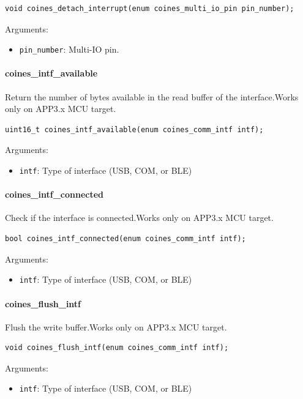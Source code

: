 \begin{lstlisting}
void coines_detach_interrupt(enum coines_multi_io_pin pin_number);
\end{lstlisting}

Arguments:
\begin{itemize}
	\item \texttt{pin\_number}: Multi-IO pin.
\end{itemize}

\paragraph{coines\_intf\_available}
Return the number of bytes available in the read buffer of the interface.Works only on APP3.x MCU target.

\begin{lstlisting}
uint16_t coines_intf_available(enum coines_comm_intf intf);
\end{lstlisting}

Arguments:
\begin{itemize}
	\item \texttt{intf}: Type of interface (USB, COM, or BLE)
\end{itemize}

\paragraph{coines\_intf\_connected}
Check if the interface is connected.Works only on APP3.x MCU target.

\begin{lstlisting}
bool coines_intf_connected(enum coines_comm_intf intf);
\end{lstlisting}

Arguments:
\begin{itemize}
	\item \texttt{intf}: Type of interface (USB, COM, or BLE)
\end{itemize}

\paragraph{coines\_flush\_intf}
Flush the write buffer.Works only on APP3.x MCU target.

\begin{lstlisting}
void coines_flush_intf(enum coines_comm_intf intf);
\end{lstlisting}

Arguments:
\begin{itemize}
	\item \texttt{intf}: Type of interface (USB, COM, or BLE)
\end{itemize}

